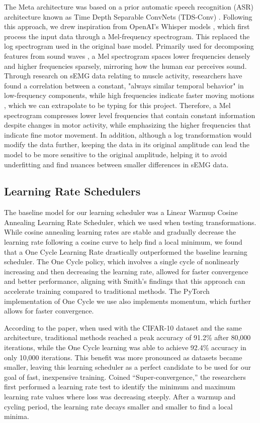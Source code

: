 \documentclass{article}
\begin{document}
The Meta architecture was based on a prior automatic speech recognition (ASR) architecture known as Time Depth Separable ConvNets (TDS-Conv) \citet{hannun}. Following this approach, we drew inspiration from OpenAI's Whisper models \cite{radford2022whisper}, which first process the input data through a Mel-frequency spectrogram. This replaced the log spectrogram used in the original base model. Primarily used for decomposing features from sound waves \citet{zhang}, a Mel spectrogram spaces lower frequencies densely and higher frequencies sparsely, mirroring how the human ear perceives sound. Through research on sEMG data relating to muscle activity, researchers have found a correlation between a constant, "always similar temporal behavior" in low-frequency components, while high frequencies indicate faster moving motions \citet{garcia}, which we can extrapolate to be typing for this project. Therefore, a Mel spectrogram compresses lower level frequencies that contain constant information despite changes in motor activity, while emphasizing the higher frequencies that indicate fine motor movement. In addition, although a log transformation would modify the data further, keeping the data in its original amplitude can lead the model to be more sensitive to the original amplitude, helping it to avoid underfitting and find nuances between smaller differences in sEMG data.


\subsection{Learning Rate Schedulers}

The baseline model for our learning scheduler was a Linear Warmup Cosine Annealing Learning Rate Scheduler, which we used when testing transformations. While cosine annealing learning rates are stable and gradually decrease the learning rate following a cosine curve to help find a local minimum, we found that a One Cycle Learning Rate \citet{smith} drastically outperformed the baseline learning scheduler. The One Cycle policy, which involves a single cycle of nonlinearly increasing and then decreasing the learning rate, allowed for faster convergence and better performance, aligning with Smith's findings that this approach can accelerate training compared to traditional methods. The PyTorch implementation of One Cycle we use also implements momentum, which further allows for faster convergence.

According to the paper, when used with the CIFAR-10 dataset and the same architecture, traditional methods reached a peak accuracy of 91.2\% after 80,000 iterations, while the One Cycle learning was able to achieve 92.4\% accuracy in only 10,000 iterations. This benefit was more pronounced as datasets became smaller, leaving this learning scheduler as a perfect candidate to be used for our goal of fast, inexpensive training. Coined “Super-convergence,” the researchers first performed a learning rate test to identify the minimum and maximum learning rate values where loss was decreasing steeply. After a warmup and cycling period, the learning rate decays smaller and smaller to find a local minima. 
\end{document}
